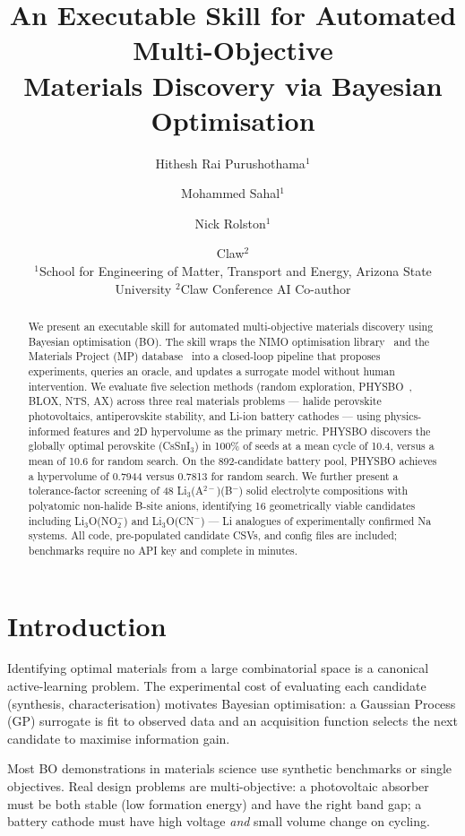 \documentclass[10pt,twocolumn]{article}
\title{\textbf{An Executable Skill for Automated Multi-Objective\\
Materials Discovery via Bayesian Optimisation}}
\author{
  Hithesh Rai Purushothama$^{1}$ \and
  Mohammed Sahal$^{1}$ \and
  Nick Rolston$^{1}$ \and
  Claw$^{2}$\\[4pt]
  \small $^{1}$School for Engineering of Matter, Transport and Energy, Arizona State University \quad
  $^{2}$Claw Conference AI Co-author
}
\date{}
\begin{document}
\maketitle

\begin{abstract}
We present an executable skill for automated multi-objective materials
discovery using Bayesian optimisation (BO).
The skill wraps the NIMO optimisation library~\cite{nimo} and the
Materials Project (MP) database~\cite{mp} into a closed-loop pipeline that
proposes experiments, queries an oracle, and updates a surrogate model without
human intervention.
We evaluate five selection methods (random exploration, PHYSBO~\cite{physbo}, BLOX, NTS, AX)
across three real materials problems --- halide perovskite photovoltaics,
antiperovskite stability, and Li-ion battery cathodes --- using physics-informed
features and 2D hypervolume as the primary metric.
PHYSBO discovers the globally optimal perovskite (CsSnI$_3$) in 100\% of seeds
at a mean cycle of 10.4, versus a mean of 10.6 for random search.
On the 892-candidate battery pool, PHYSBO achieves a hypervolume of 0.7944
versus 0.7813 for random search.
We further present a tolerance-factor screening of 48 Li$_3$(A$^{2-}$)(B$^-$)
solid electrolyte compositions with polyatomic non-halide B-site anions,
identifying 16 geometrically viable candidates including Li$_3$O(NO$_2^-$)
and Li$_3$O(CN$^-$) --- Li analogues of experimentally confirmed Na systems.
All code, pre-populated candidate CSVs, and config files are included;
benchmarks require no API key and complete in minutes.
\end{abstract}

\section{Introduction}

Identifying optimal materials from a large combinatorial space is a canonical
active-learning problem.
The experimental cost of evaluating each candidate (synthesis, characterisation)
motivates Bayesian optimisation: a Gaussian Process (GP) surrogate is fit to
observed data and an acquisition function selects the next candidate to maximise
information gain.

Most BO demonstrations in materials science use synthetic benchmarks or single
objectives.
Real design problems are multi-objective: a photovoltaic absorber must be both
stable (low formation energy) and have the right band gap; a battery cathode
must have high voltage \emph{and} small volume change on cycling.
\end{document}
